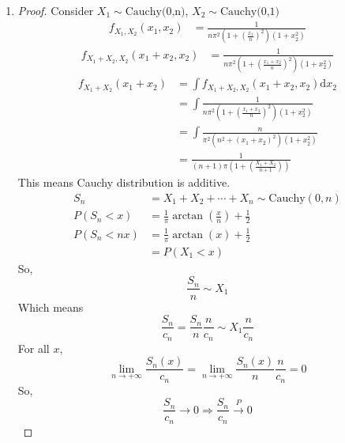 \documentclass{article}
\begin{document}
\begin{enumerate}
        \item \begin{proof}
            Consider $X_1\sim \text{Cauchy(0,n)}$, $X_2\sim \text{Cauchy(0,1)}$ 
            \begin{align*}
                f_{X_1,X_2}(x_1,x_2)&=\frac{1}{n\pi^2\left(1+\left(\frac{x_1}{n}\right)^2\right)(1+x_2^2)}
            \end{align*}
            \begin{align*}
                f_{X_1+X_2,X_2}(x_1+x_2,x_2)&=\frac{1}{n\pi^2\left(1+\left(\frac{x_1+x_2}{n}\right)^2\right)(1+x_2^2)}
            \end{align*}
            \begin{align*}
                f_{X_1+X_2}(x_1+x_2)&=\int f_{X_1+X_2,X_2}(x_1+x_2,x_2) \text{d}x_2\\
                &=\int\frac{1}{n\pi^2\left(1+\left(\frac{x_1+x_2}{n}\right)^2\right)(1+x_2^2)}\\
                &=\int\frac{n}{\pi^2\left(n^2+\left(x_1+x_2\right)^2\right)(1+x_2^2)}\\
                &=\frac{1}{(n+1)\pi\left(1+\left(\frac{X_1+X_2}{n+1}\right)\right)}
            \end{align*}
            This means Cauchy distribution is additive.
            \begin{align*}
                S_n&=X_1+X_2+\cdots+X_n\sim\text{Cauchy}(0,n)\\
                P(S_n<x)&=\frac{1}{\pi}\arctan(\frac{x}{n})+\frac{1}{2}\\
                P(S_n<nx) &=\frac{1}{\pi}\arctan(x)+\frac{1}{2}\\
                &=P(X_1<x)
            \end{align*}
            So, $$\frac{S_n}{n}\sim X_1$$
            Which means
            $$\frac{S_n}{c_n}=\frac{S_n}{n}\frac{n}{c_n}\sim X_1\frac{n}{c_n}$$
            For all $x$,
            $$\lim_{n\to+\infty}\frac{S_n(x)}{c_n}=\lim_{n\to+\infty}\frac{S_n(x)}{n}\frac{n}{c_n}=0$$
            So, $$\frac{S_n}{c_n}\to 0 \Rightarrow \frac{S_n}{c_n}\overset{P}{\to}0$$
        \end{proof}
    
    \end{enumerate}
\end{document}
